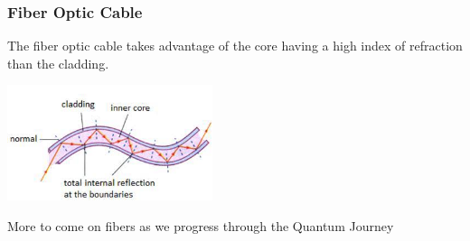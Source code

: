 \documentclass{beamer}
\begin{document}
\begin{frame}\frametitle{Fiber Optic Cable}
The fiber optic cable takes advantage of the core having a high index of refraction than the cladding.

\begin{center}
\includegraphics[width=6cm]{fig/cladding.jpg}
\end{center}

\vspace{3cm}

More to come on fibers as we progress through the Quantum Journey
\end{frame}
\end{document}
